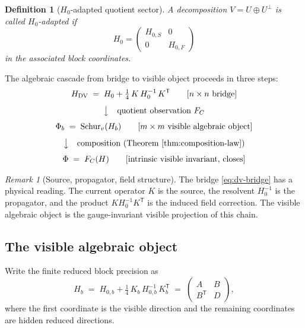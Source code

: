 \documentclass[11pt]{article}
\numberwithin{equation}{section}
\theoremstyle{thmcompact}
\newtheorem{definition}[theorem]{Definition}
\theoremstyle{remark}
\newtheorem*{remarkplain}{Remark}
\newenvironment{remark}[1][]%
{\begin{remarkbox}\begin{remarkplain}[#1]\normalfont}
		{\end{remarkplain}\end{remarkbox}}
\begin{document}
\begin{definition}[$H_0$-adapted quotient sector]
\label{def:h0-adapted}
A decomposition $V = U \oplus U^{\perp}$ is called $H_0$-adapted if
\begin{equation}
H_0 =
\begin{pmatrix}
H_{0,S} & 0 \\
0 & H_{0,F}
\end{pmatrix}
\label{eq:h0-adapted}
\end{equation}
in the associated block coordinates.
\end{definition}

The algebraic cascade from bridge to visible object proceeds in three steps:
\begin{equation}
\begin{gathered}
H_{\mathrm{DV}} \;=\; H_0 + \tfrac{1}{4}\, K\, H_0^{-1}\, K^{\mathsf T}
\qquad [n \times n \text{ bridge}] \\[4pt]
\big\downarrow \quad \text{quotient observation } F_C \\[4pt]
\Phi_b \;=\; \operatorname{Schur}_v(H_b)
\qquad [m \times m \text{ visible algebraic object}] \\[4pt]
\big\downarrow \quad \text{composition (Theorem~\ref{thm:composition-law})} \\[4pt]
\Phi \;=\; F_C(H)
\qquad [\text{intrinsic visible invariant, closes}]
\end{gathered}
\label{eq:algebraic-cascade}
\end{equation}

\begin{remark}[Source, propagator, field structure]
The bridge \eqref{eq:dv-bridge} has a physical reading. The current operator $K$ is the source, the resolvent $H_0^{-1}$ is the propagator, and the product $K H_0^{-1} K^{\mathsf T}$ is the induced field correction. The visible algebraic object is the gauge-invariant visible projection of this chain.
\end{remark}

\subsection{The visible algebraic object}

Write the finite reduced block precision as
\begin{equation}
H_b
\;=\;
H_{0,b} + \tfrac{1}{4}\, K_b\, H_{0,b}^{-1}\, K_b^{\mathsf T}
\;=\;
\begin{pmatrix}
A & B \\
B^{\mathsf T} & D
\end{pmatrix},
\label{eq:hb-block}
\end{equation}
where the first coordinate is the visible direction and the remaining coordinates are hidden reduced directions.
\end{document}
